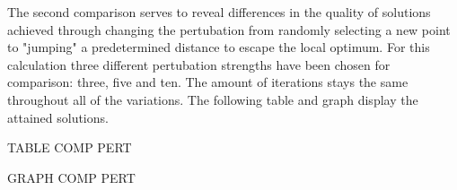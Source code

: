 The second comparison serves to reveal differences in the quality of solutions achieved through changing the pertubation from randomly selecting a new point to "jumping" a predetermined distance to escape the local optimum. For this calculation three different pertubation strengths have been chosen for comparison: three, five and ten. The amount of iterations stays the same throughout all of the variations. The following table and graph display the attained solutions.

TABLE COMP PERT

GRAPH COMP PERT

